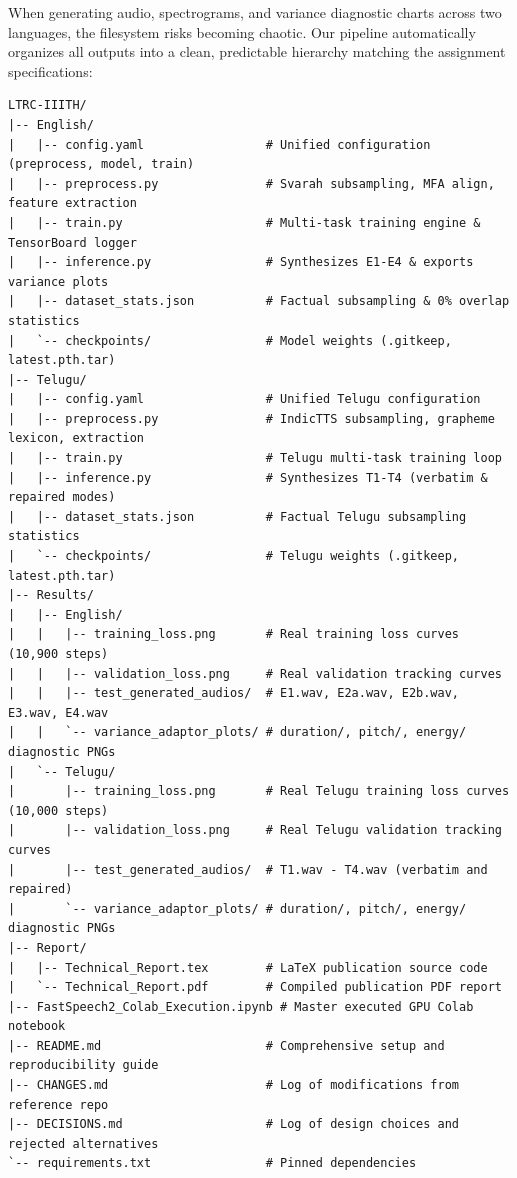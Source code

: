 \documentclass[11pt,a4paper]{article}
\begin{document}
When generating audio, spectrograms, and variance diagnostic charts across two languages, the filesystem risks becoming chaotic. Our pipeline automatically organizes all outputs into a clean, predictable hierarchy matching the assignment specifications:

\begin{verbatim}
LTRC-IIITH/
|-- English/
|   |-- config.yaml                 # Unified configuration (preprocess, model, train)
|   |-- preprocess.py               # Svarah subsampling, MFA align, feature extraction
|   |-- train.py                    # Multi-task training engine & TensorBoard logger
|   |-- inference.py                # Synthesizes E1-E4 & exports variance plots
|   |-- dataset_stats.json          # Factual subsampling & 0% overlap statistics
|   `-- checkpoints/                # Model weights (.gitkeep, latest.pth.tar)
|-- Telugu/
|   |-- config.yaml                 # Unified Telugu configuration
|   |-- preprocess.py               # IndicTTS subsampling, grapheme lexicon, extraction
|   |-- train.py                    # Telugu multi-task training loop
|   |-- inference.py                # Synthesizes T1-T4 (verbatim & repaired modes)
|   |-- dataset_stats.json          # Factual Telugu subsampling statistics
|   `-- checkpoints/                # Telugu weights (.gitkeep, latest.pth.tar)
|-- Results/
|   |-- English/
|   |   |-- training_loss.png       # Real training loss curves (10,900 steps)
|   |   |-- validation_loss.png     # Real validation tracking curves
|   |   |-- test_generated_audios/  # E1.wav, E2a.wav, E2b.wav, E3.wav, E4.wav
|   |   `-- variance_adaptor_plots/ # duration/, pitch/, energy/ diagnostic PNGs
|   `-- Telugu/
|       |-- training_loss.png       # Real Telugu training loss curves (10,000 steps)
|       |-- validation_loss.png     # Real Telugu validation tracking curves
|       |-- test_generated_audios/  # T1.wav - T4.wav (verbatim and repaired)
|       `-- variance_adaptor_plots/ # duration/, pitch/, energy/ diagnostic PNGs
|-- Report/
|   |-- Technical_Report.tex        # LaTeX publication source code
|   `-- Technical_Report.pdf        # Compiled publication PDF report
|-- FastSpeech2_Colab_Execution.ipynb # Master executed GPU Colab notebook
|-- README.md                       # Comprehensive setup and reproducibility guide
|-- CHANGES.md                      # Log of modifications from reference repo
|-- DECISIONS.md                    # Log of design choices and rejected alternatives
`-- requirements.txt                # Pinned dependencies
\end{verbatim}
\end{document}
